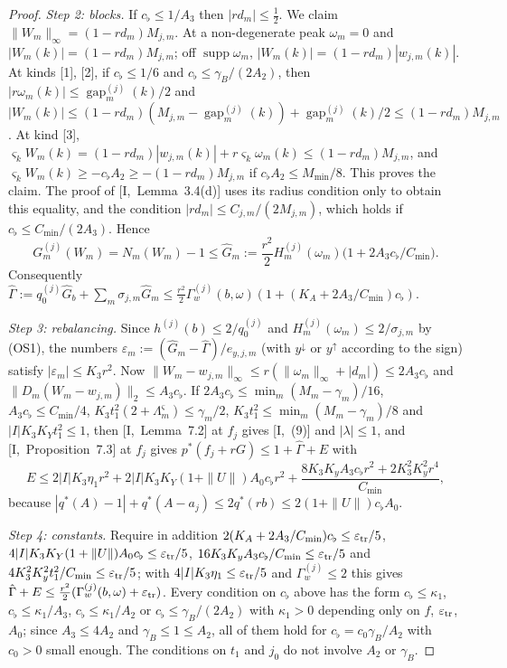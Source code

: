 \documentclass[10pt]{amsart}
\theoremstyle{definition}
\theoremstyle{remark}
\newcommand{\supp}{\operatorname{supp}}
\newcommand{\gap}{\operatorname{gap}}
\begin{document}
\begin{proof}
\emph{Step 2: blocks.}  If $c_\flat\le1/A_3$ then $|rd_m|\le\frac12$.  We
claim $\|W_m\|_\infty=(1-rd_m)M_{j,m}$.  At a non-degenerate peak $\omega_m=0$
and $|W_m(k)|=(1-rd_m)M_{j,m}$; off $\supp\omega_m$, $|W_m(k)|=(1-rd_m)
|w_{j,m}(k)|$.  At kinds [1], [2], if $c_\flat\le1/6$ and $c_\flat\le
\gamma_B/(2A_2)$, then $|r\omega_m(k)|\le\gap^{(j)}_m(k)/2$ and
$|W_m(k)|\le(1-rd_m)(M_{j,m}-\gap^{(j)}_m(k))+\gap^{(j)}_m(k)/2\le(1-rd_m)
M_{j,m}$.  At kind [3], $\varsigma_kW_m(k)=(1-rd_m)|w_{j,m}(k)|+r\varsigma_k
\omega_m(k)\le(1-rd_m)M_{j,m}$, and $\varsigma_kW_m(k)\ge-c_\flat A_2\ge
-(1-rd_m)M_{j,m}$ if $c_\flat A_2\le M_{\min}/8$.  This proves the claim.
The proof of [I,~Lemma~3.4(d)] uses its radius condition only to obtain
this equality, and the condition $|rd_m|\le C_{j,m}/(2M_{j,m})$, which holds
if $c_\flat\le C_{\min}/(2A_3)$.  Hence
\[
 G^{(j)}_m(W_m)=N_m(W_m)-1\le\hat G_m:=\frac{r^2}2H^{(j)}_m(\omega_m)\big(1+
 2A_3c_\flat/C_{\min}\big).
\]
Consequently $\hat\Gamma:=q^{(j)}_0\hat G_b+\sum_m\sigma_{j,m}\hat G_m\le\frac{r^2}2
\Gamma^{(j)}_w(b,\omega)(1+(K_A+2A_3/C_{\min})c_\flat)$.

\emph{Step 3: rebalancing.}  Since $h^{(j)}(b)\le2/q^{(j)}_0$ and
$H^{(j)}_m(\omega_m)\le2/\sigma_{j,m}$ by (OS1), the numbers $\varepsilon_m:=
(\hat G_m-\hat\Gamma)/e_{y,j,m}$ (with $y^\downarrow$ or $y^\uparrow$
according to the sign) satisfy $|\varepsilon_m|\le K_3r^2$.  Now
$\|W_m-w_{j,m}\|_\infty\le r(\|\omega_m\|_\infty+|d_m|)\le2A_3c_\flat$ and
$\|D_m(W_m-w_{j,m})\|_2\le A_3c_\flat$.  If $2A_3c_\flat\le\min_m(M_m-\gamma_m)
/16$, $A_3c_\flat\le C_{\min}/4$, $K_3t_1^2(2+\Lambda^\varsigma_m)\le\gamma_m/2$,
$K_3t_1^2\le\min_m(M_m-\gamma_m)/8$ and $|I|K_3K_Yt_1^2\le1$, then
[I,~Lemma~7.2] at $f_j$ gives [I,~(9)] and $|\lambda|\le1$, and
[I,~Proposition~7.3] at $f_j$ gives $p^*(f_j+rG)\le1+\hat\Gamma+E$ with
\[
 E\le2|I|K_3\eta_1r^2+2|I|K_3K_Y(1+\|U\|)A_0c_\flat r^2+\frac{8K_3K_yA_3
 c_\flat r^2+2K_3^2K_y^2r^4}{C_{\min}},
\]
because $|q^*(A)-1|+q^*(A-a_j)\le2q^*(rb)\le2(1+\|U\|)c_\flat A_0$.

\emph{Step 4: constants.}  Require in addition
$2(K_A+2A_3/C_{\min})c_\flat\le\varepsilon_{\rm tr}/5$,
$4|I|K_3K_Y(1+\|U\|)A_0c_\flat\le\varepsilon_{\rm tr}/5$,
$16K_3K_yA_3c_\flat/C_{\min}\le\varepsilon_{\rm tr}/5$ and
$4K_3^2K_y^2t_1^2/C_{\min}\le\varepsilon_{\rm tr}/5$; with $4|I|K_3\eta_1\le
\varepsilon_{\rm tr}/5$ and $\Gamma^{(j)}_w\le2$ this gives $\hat\Gamma+E\le
\frac{r^2}2(\Gamma^{(j)}_w(b,\omega)+\varepsilon_{\rm tr})$.  Every condition
on $c_\flat$ above has the form $c_\flat\le\kappa_1$, $c_\flat\le\kappa_1/A_3$,
$c_\flat\le\kappa_1/A_2$ or $c_\flat\le\gamma_B/(2A_2)$ with $\kappa_1>0$
depending only on $f$, $\varepsilon_{\rm tr}$, $A_0$; since $A_3\le4A_2$ and
$\gamma_B\le1\le A_2$, all of them hold for $c_\flat=c_0\gamma_B/A_2$ with
$c_0>0$ small enough.  The conditions on $t_1$ and $j_0$ do not involve
$A_2$ or $\gamma_B$.
\end{proof}
\end{document}
